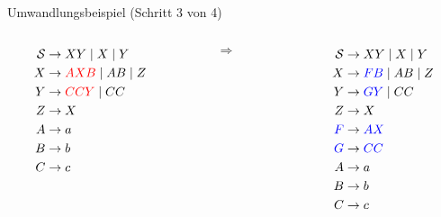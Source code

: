 \documentclass{beamer}
\begin{document}
{{\begin{exampleblock}{Umwandlungsbeispiel (Schritt 3 von 4)}
\begin{columns}[c]
\begin{column}{0.3\textwidth}
\begin{align*}
\mathcal{S} &\rightarrow XY \mid X \mid  Y \\
X &\rightarrow \textcolor{red}{AXB} \mid AB \mid Z \\
Y &\rightarrow \textcolor{red}{CCY} \mid CC\\
Z &\rightarrow X\\
A &\rightarrow a\\
B &\rightarrow b\\
C &\rightarrow c\\
\end{align*}
\end{column}
%
\
\begin{column}{0.05\textwidth}
$\Rightarrow$
\end{column}
%
\begin{column}{0.3\textwidth}
\begin{align*}
\mathcal{S} &\rightarrow XY \mid X \mid  Y\\
X &\rightarrow \textcolor{blue}{FB} \mid AB \mid Z \\
Y &\rightarrow \textcolor{blue}{GY} \mid CC\\
Z &\rightarrow X\\
\textcolor{blue}{F} &\rightarrow \textcolor{blue}{AX}\\
\textcolor{blue}{G} &\rightarrow \textcolor{blue}{CC}\\
A &\rightarrow a\\
B &\rightarrow b\\
C &\rightarrow c\\
\end{align*}
\end{column}
\end{columns}
\end{exampleblock}
}

}
\end{document}
